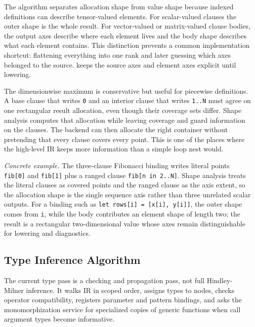 The algorithm separates allocation shape from value shape because indexed
definitions can describe tensor-valued elements. For scalar-valued clauses the
outer shape is the whole result. For vector-valued or matrix-valued clause
bodies, the output axes describe where each element lives and the body shape
describes what each element contains. This distinction prevents a common
implementation shortcut: flattening everything into one rank and later guessing
which axes belonged to the source. \einlang{} keeps the source axes and element
axes explicit until lowering.

The dimensionwise maximum is conservative but useful for piecewise definitions.
A base clause that writes \texttt{0} and an interior clause that writes
\texttt{1..N} must agree on one rectangular result allocation, even though their
coverage sets differ. Shape analysis computes that allocation while leaving
coverage and guard information on the clauses. The backend can then allocate the
right container without pretending that every clause covers every point. This is
one of the places where the high-level IR keeps more information than a simple
loop nest would.

\textit{Concrete example.} The three-clause Fibonacci binding writes literal
points \texttt{fib[0]} and \texttt{fib[1]} plus a ranged clause
\texttt{fib[n in 2..N]}. Shape analysis treats the literal clauses as covered
points and the ranged clause as the axis extent, so the allocation shape is the
single sequence axis rather than three unrelated scalar outputs. For a binding
such as \texttt{let rows[i] = [x[i], y[i]]}, the outer shape comes from
\texttt{i}, while the body contributes an element shape of length two; the
result is a rectangular two-dimensional value whose axes remain distinguishable
for lowering and diagnostics.

\subsection{Type Inference Algorithm}

The current type pass is a checking and propagation pass, not full Hindley-
Milner inference. It walks IR in scoped order, assigns types to nodes, checks
operator compatibility, registers parameter and pattern bindings, and asks the
monomorphization service for specialized copies of generic functions when call
argument types become informative.

